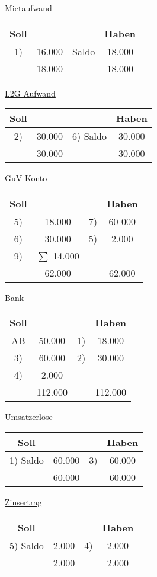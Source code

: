 \documentclass[paper=a4, fontsize=11pt]{scrartcl}
\numberwithin{equation}{section}
\numberwithin{figure}{section}
\numberwithin{table}{section}
\begin{document}
\underline{Mietaufwand}

\begin{tabular}{cc|cc}
Soll & & & Haben \\
\hline
1) & 16.000 & Saldo & 18.000 \\
\hline
 & 18.000 & & 18.000 \\
\end{tabular}

\underline{L2G Aufwand}

\begin{tabular}{cc|cc}
Soll & & & Haben \\
\hline
2) & 30.000 & 6) Saldo & 30.000 \\
\hline
& 30.000 & & 30.000 \\
\end{tabular}

\underline{GuV Konto}

\begin{tabular}{cc|cc}
Soll & & & Haben \\
\hline
5) & 18.000 & 7)  & 60-000\\
6) & 30.000 & 5) & 2.000 \\
9) & $\sum$ 14.000  & & \\
\hline
& 62.000 & & 62.000 \\
\end{tabular}

\underline{Bank}

\begin{tabular}{cc|cc}
Soll & & & Haben \\
\hline
AB & 50.000 & 1) & 18.000 \\
3) & 60.000 & 2) & 30.000 \\
4) & 2.000 & & \\
\hline
& 112.000 & & 112.000 \\
\end{tabular}

\underline{Umsatzerlöse}

\begin{tabular}{cc|cc}
Soll & & & Haben \\
\hline
1) Saldo & 60.000 & 3) & 60.000 \\
\hline
 & 60.000 & & 60.000 \\
\end{tabular}

\underline{Zinsertrag}

\begin{tabular}{cc|cc}
Soll & & & Haben \\
\hline
5) Saldo & 2.000 & 4) & 2.000 \\
\hline
& 2.000 & & 2.000 \\
\end{tabular}
\end{document}
